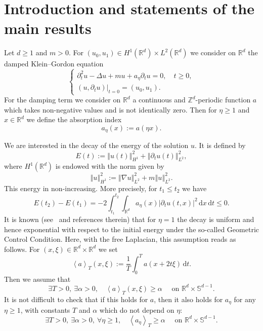 \documentclass[11pt]{article}
\theoremstyle{definition}
\numberwithin{equation}{section}
\numberwithin{figure}{section}
\numberwithin{table}{section}
\newcommand{\abs}[1]{\left\vert #1\right\vert}
\newcommand{\nr}[1]{\left\Vert #1\right\Vert}
\newcommand{\pppg}[1] {\left< #1 \right>}
\renewcommand{\leq}{\leqslant}
\renewcommand{\geq}{\geqslant}
\newcommand{\1}{\mathds 1}
\newcommand{\R}{\mathbb{R}}
\renewcommand{\a}{\alpha}
\newcommand{\D}{\Delta}
\newcommand{\x}{\xi}
\newcommand{\dd}{\mathrm{d}}
\newcommand{\dx}{\dd x}
\newcommand{\dt}{\dd t}
\let\oldexists\exists
\renewcommand*{\exists}{\mathrel{\oldexists}}
\let\oldforall\forall
\renewcommand*{\forall}{\mathrel{\oldforall}}
\begin{document}
\section{Introduction and statements of the main results}

Let $d \geq 1$ and $m> 0$. For $(u_0,u_1) \in H^1(\R^d)\times L^2(\R^d)$ we consider on $\R^d$ the damped Klein--Gordon equation
\begin{equation}\label{KG}
\begin{cases}
\partial_t^2 u -\D u + mu + a_\eta \partial_t u = 0, \quad t \geq 0,\\
(u,\partial_t u)|_{t=0} = (u_0,u_1).
\end{cases}
\end{equation}
For the damping term we consider on $\R^d$ a continuous and $\mathbb Z^d$-periodic function $a$ which takes non-negative values and is not identically zero. Then for $\eta \geq 1$ and $x \in \R^d$ we define the absorption index
\[
a_\eta(x) := a(\eta x).
\]



We are interested in the decay of the energy of the solution $u$. It is defined by
\[
E(t) := \nr{u(t)}_{H^1}^2 + \nr{\partial_t u(t)}_{L^2}^2,
\]
where $H^1(\R^d)$ is endowed with the norm given by
\begin{equation}\label{def-norme-H1}
\nr{u}_{H^1}^2 := \nr{\nabla u}_{L^2}^2 + m \nr{u}_{L^2}^2.
\end{equation}
This energy in non-increasing. More precisely, for $t_1 \leq t_2$ we have
\[
E(t_2) - E(t_1) = -2 \int_{t_1}^{t_2} \int_{\R^d} a_\eta(x) \abs{\partial_t u(t,x)}^2 \, \dx \, \dt \leq 0.
\]
It is known (see~\cite{BurqJo} and references therein) that for $\eta = 1$ the decay is uniform and hence exponential with respect to the initial energy under the so-called Geometric Control Condition. Here, with the free Laplacian, this assumption reads as follows. For $(x,\x) \in \R^d \times \R^d$ we set
\[
\pppg {a}_T (x,\x) := \frac 1 T \int_0^T a(x+2t\x) \, \dt.
\]
Then we assume that
\begin{equation}\label{hyp-GCC-usual}
\exists T > 0,\ \exists \a > 0, \quad \pppg {a}_T (x,\x) \geq \a\quad \text{ on } \R^{d} \times \mathbb S^{d-1}.
\end{equation}
It is not difficult to check that if this holds for $a$, then it also holds for $a_\eta$ for any $\eta \geq 1$, with constants $T$ and $\a$ which do not depend on $\eta$:
\begin{equation}\label{hyp-GCC-unif}
\exists T > 0,\ \exists \a > 0,\ \forall \eta \geq 1, \quad \pppg {a_\eta}_T \geq \a \quad \text{ on } \R^{d} \times \mathbb S^{d-1}.
\end{equation}
\end{document}
